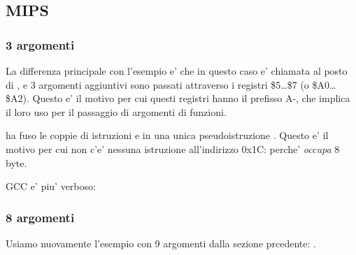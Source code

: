 \subsection{MIPS}

\subsubsection{3 argomenti}


La differenza principale con l'esempio \q{\HelloWorldSectionName} e' che in questo caso \printf e' chiamata 
al posto di \puts, e 3 argomenti aggiuntivi sono passati attraverso i registri \$5\dots \$7 (o \$A0\dots \$A2).
Questo e' il motivo per cui questi registri hanno il prefisso A-, che implica il loro uso per il passaggio di argomenti di funzioni.





\IDA ha fuso le coppie di istruzioni  e  in una unica pseudoistruzione .
Questo e' il motivo per cui non c'e' nessuna istruzione all'indirizzo 0x1C: perche'  \emph{occupa} 8 byte.%


\NonOptimizing GCC e' piu' verboso:





\subsubsection{8 argomenti}

Usiamo nuovamente l'esempio con 9 argomenti dalla sezione prcedente: .




